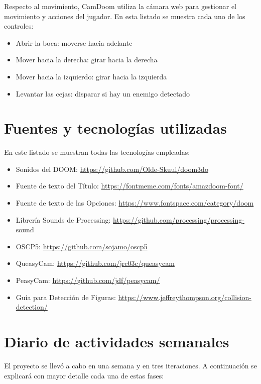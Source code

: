\documentclass{article}
\begin{document}
Respecto al movimiento, CamDoom utiliza la cámara web para gestionar el movimiento y
acciones del jugador. En esta listado se muestra cada uno de los controles:

\begin{itemize}
    \item Abrir la boca: moverse hacia adelante
    \item Mover hacia la derecha: girar hacia la derecha
    \item Mover hacia la izquierdo: girar hacia la izquierda
    \item Levantar las cejas: disparar si hay un enemigo detectado
\end{itemize}

\section{Fuentes y tecnologías utilizadas}

En este listado se muestran todas las tecnologías empleadas:

\begin{itemize}
    \item Sonidos del DOOM: \url{https://github.com/Olde-Skuul/doom3do}
    \item Fuente de texto del Título: \url{https://fontmeme.com/fonts/amazdoom-font/}
    \item Fuente de texto de las Opciones: \url{https://www.fontspace.com/category/doom}
    \item Librería Sounds de Processing: \url{https://github.com/processing/processing-sound}
    \item OSCP5: \url{https://github.com/sojamo/oscp5}
    \item QueasyCam: \url{https://github.com/jrc03c/queasycam}
    \item PeasyCam: \url{https://github.com/jdf/peasycam/}
    \item Guía para Detección de Figuras: \url{https://www.jeffreythompson.org/collision-detection/}
\end{itemize}

\section{Diario de actividades semanales}

El proyecto se llevó a cabo en una semana y en tres iteraciones. A continuación se explicará
con mayor detalle cada una de estas fases:
\end{document}
